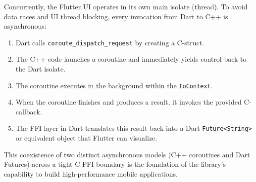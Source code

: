 Concurrently, the Flutter UI operates in its own main isolate (thread). To avoid data races and UI thread blocking, every invocation from Dart to C++ is asynchronous:
\begin{enumerate}
    \item Dart calls \texttt{coroute\_dispatch\_request} by creating a C-struct.
    \item The C++ code launches a coroutine and immediately yields control back to the Dart isolate.
    \item The coroutine executes in the background within the \texttt{IoContext}.
    \item When the coroutine finishes and produces a result, it invokes the provided C-callback.
    \item The FFI layer in Dart translates this result back into a Dart \texttt{Future<String>} or equivalent object that Flutter can visualize.
\end{enumerate}

This coexistence of two distinct asynchronous models (C++ coroutines and Dart Futures) across a tight C FFI boundary is the foundation of the library's capability to build high-performance mobile applications.
